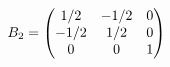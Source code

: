 \documentclass[preview]{standalone}
\begin{document}
\begin{align*}
\special{dvisvgm:raw <g id='unique000'>}B_2=\begin{pmatrix}1/2&-1/2&0\\-1/2&1/2&0\\0&0&1\end{pmatrix}\special{dvisvgm:raw </g>}
\end{align*}
\end{document}
